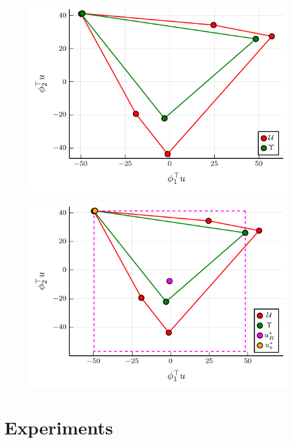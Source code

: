 \documentclass{beamer}
\begin{document}
\begin{frame}

\begin{figure}
  \centering
  \includegraphics[width=\linewidth]{plots/visual_U_and_Upsilon.pdf}
\end{figure}
\end{frame}

\begin{frame}

\begin{figure}
  \centering
  \includegraphics[width=\linewidth]{plots/visual_solve_cheb.pdf}
\end{figure}
\end{frame}

\section*{Experiments}
\end{document}
